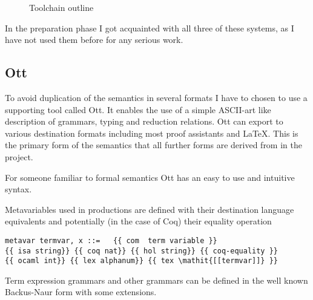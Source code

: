 \documentclass[12pt,twoside,notitlepage]{report}
\begin{document}
\begin{figure}[h!]
\centering
{}
\caption{Toolchain outline}
\end{figure}

In the preparation phase I got acquainted with all three of these systems, as I have not used them before for any serious work.
\subsection{Ott}
To avoid duplication of the semantics in several formats I have to chosen to use a supporting tool called Ott. It enables the use of a simple ASCII-art like description of grammars, typing and reduction relations. Ott can export to various destination formats including most proof assistants and \LaTeX. This is the primary form of the semantics that all further forms are derived from in the project.

For someone familiar to formal semantics Ott has an easy to use and intuitive syntax. 

Metavariables used in productions are defined with their destination language equivalents and potentially (in the case of Coq) their equality operation 
\begin{lstlisting}[language={Ott}, caption={Ott metavariable definition}]
metavar termvar, x ::=   {{ com  term variable }} 
{{ isa string}} {{ coq nat}} {{ hol string}} {{ coq-equality }}
{{ ocaml int}} {{ lex alphanum}} {{ tex \mathit{[[termvar]]} }}
\end{lstlisting}

Term expression grammars and other grammars can be defined in the well known Backus-Naur form with some extensions.
\end{document}
